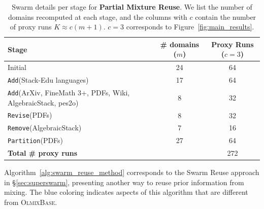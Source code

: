 \documentclass[table]{ai2style/ai2}
\newcommand{\base}[0]{\textsc{OlmixBase}\xspace}
\newcommand{\Add}[0]{\texttt{Add}\xspace}
\newcommand{\Remove}[0]{\texttt{Remove}\xspace}
\newcommand{\Partition}[0]{\texttt{Partition}\xspace}
\newcommand{\Revise}[0]{\texttt{Revise}\xspace}
\begin{document}
\begin{table}[!h]
\centering
\caption{Swarm details per stage for \textbf{Partial Mixture Reuse}. We list the number of domains recomputed at each stage, and the columns with $c$ contain the number of proxy runs $K \approx c(m+1)$. $c=3$ corresponds to Figure~\ref{fig:main_results}.}
\footnotesize
\setlength{\tabcolsep}{6pt}
\begin{tabular}{lcc}
\toprule
\textbf{Stage} & \textbf{\# domains ($m$)} & \textbf{Proxy Runs ($c=3$)} \\
\midrule
Initial      & 24 & 64 \\
\Add (Stack-Edu languages)  & 17 & 64 \\
\Add (ArXiv, FineMath 3+, PDFs, Wiki, AlgebraicStack, pes2o) & 8 & 32 \\
\Revise (PDFs) & 8 & 32 \\
\Remove (AlgebraicStack) & 7 & 16 \\
\Partition (PDFs) & 27 & 64 \\
\midrule
\textbf{Total \# proxy runs} &  & 272 \\
\bottomrule
\end{tabular}
\label{tab:cost_partialreuse}
\end{table}

Algorithm~\ref{alg:swarm_reuse_method} corresponds to the Swarm Reuse approach in \S\ref{sec:superswarm}, presenting another way to reuse prior information from mixing. 
The blue coloring indicates aspects of this algorithm that are different from \base. 
\end{document}
